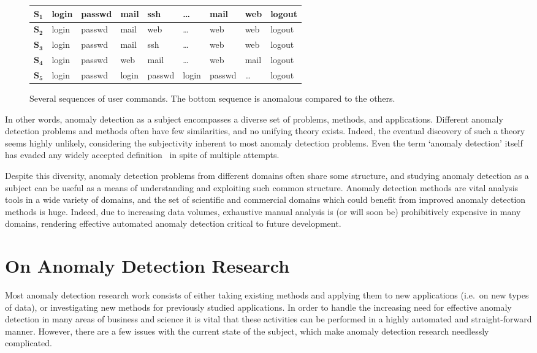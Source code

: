 \begin{figure}[htb]
    \centering
    \begin{tabular}{| l | l l l l l l l l |}
        \hline
        $\mathbf{S_1}$ & login & passwd & mail & ssh & \dots & mail & web & logout \\ \hline
        $\mathbf{S_2}$ & login & passwd & mail & web & \dots & web & web & logout \\ \hline
        $\mathbf{S_3}$ & login & passwd & mail & ssh & \dots & web & web & logout \\ \hline
        $\mathbf{S_4}$ & login & passwd & web & mail & \dots & web & mail & logout \\ \hline
        $\mathbf{S_5}$ & login & passwd & login & passwd & login & passwd & \dots & logout \\\hline
    \end{tabular}
    \caption{Several sequences of user commands. The bottom sequence is anomalous compared to the others.}
\label{fig:example1}
\end{figure}

In other words, anomaly detection as a subject encompasses a diverse set of problems, methods, and applications. Different anomaly detection problems and methods often have few similarities, and no unifying theory exists. Indeed, the eventual discovery of such a theory seems highly unlikely, considering the subjectivity inherent to most anomaly detection problems. Even the term `anomaly detection' itself has evaded any widely accepted definition~\cite{hodge} in spite of multiple attempts.

Despite this diversity, anomaly detection problems from different domains often share some structure, and studying anomaly detection as a subject can be useful as a means of understanding and exploiting such common structure. Anomaly detection methods are vital analysis tools in a wide variety of domains, and the set of scientific and commercial domains which could benefit from improved anomaly detection methods is huge. Indeed, due to increasing data volumes, exhaustive manual analysis is (or will soon be) prohibitively expensive in many domains, rendering effective automated anomaly detection critical to future development.

\section{On Anomaly Detection Research}

Most anomaly detection research work consists of either taking existing methods and applying them to new applications (i.e.\ on new types of data), or investigating new methods for previously studied applications. In order to handle the increasing need for effective anomaly detection in many areas of business and science it is vital that these activities can be performed in a highly automated and straight-forward manner. However, there are a few issues with the current state of the subject, which make anomaly detection research needlessly complicated.

